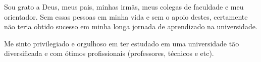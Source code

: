 \begin{agradecimentos}
Sou grato a Deus, meus pais, minhas irmãs, meus colegas de faculdade e meu orientador. Sem essas pessoas 
em minha vida e sem o apoio destes, certamente não teria obtido sucesso em minha longa jornada de aprendizado
na universidade.

Me sinto privilegiado e orgulhoso em ter estudado em uma universidade tão diversificada e com ótimos profissionais (professores,
técnicos e etc).

\end{agradecimentos}
